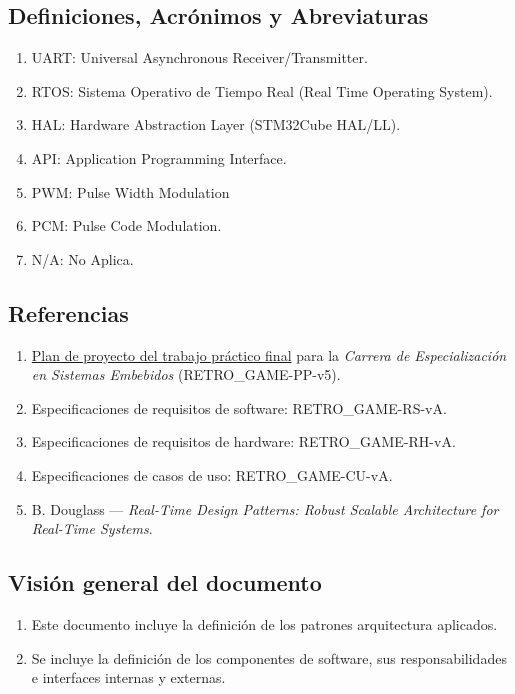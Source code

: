 \documentclass[11pt,a4paper]{article}
\begin{document}
\subsection{Definiciones, Acrónimos y Abreviaturas}
\begin{enumerate}
    \item UART: Universal Asynchronous Receiver/Transmitter. 
    \item RTOS: Sistema Operativo de Tiempo Real (Real Time Operating System).
    \item HAL: Hardware Abstraction Layer (STM32Cube HAL/LL).
    \item API: Application Programming Interface.
    \item PWM: Pulse Width Modulation
    \item PCM: Pulse Code Modulation.
    \item N/A: No Aplica.
\end{enumerate}


\subsection{Referencias}
\begin{enumerate}
  \item \href{https://drive.google.com/file/d/1C3vEYR8wME6EzlZVVC-gT2u86dwnoZA-/view?usp=sharing}{Plan de proyecto del trabajo práctico final} para la \textit{Carrera de Especialización en Sistemas Embebidos} (RETRO\_GAME-PP-v5). 
  \item Especificaciones de requisitos de software: RETRO\_GAME-RS-vA.
  \item Especificaciones de requisitos de hardware: RETRO\_GAME-RH-vA.
  \item Especificaciones de casos de uso: RETRO\_GAME-CU-vA.
  \item B. Douglass — \emph{Real-Time Design Patterns: Robust Scalable Architecture for Real-Time Systems}.
\end{enumerate}


\subsection{Visión general del documento}
\begin{enumerate}
    \item Este documento incluye la definición de los patrones arquitectura aplicados.
    \item Se incluye la definición de los componentes de software, sus responsabilidades e interfaces internas y
externas.
\end{enumerate}
\end{document}
